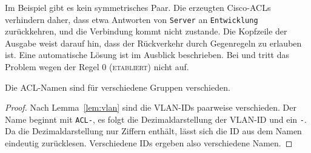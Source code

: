 \begin{bemerkung}
	Im Beispiel gibt es kein symmetrisches Paar. Die erzeugten Cisco-ACLs verhindern daher, dass etwa Antworten von \texttt{Server} an \texttt{Entwicklung} zurückkehren, und die Verbindung kommt nicht zustande. Die Kopfzeile der Ausgabe weist darauf hin, dass der Rückverkehr durch Gegenregeln zu erlauben ist. Eine automatische Lösung ist im Ausblick beschrieben. Bei  und  tritt das Problem wegen der Regel $0$ (\textsc{etabliert}) nicht auf.
\end{bemerkung}

\begin{lemma}
	Die ACL-Namen  sind für verschiedene Gruppen verschieden.
\end{lemma}

\begin{proof}
	Nach Lemma~\ref{lem:vlan} sind die VLAN-IDs paarweise verschieden. Der Name beginnt mit \texttt{ACL-}, es folgt die Dezimaldarstellung der VLAN-ID und ein \texttt{-}. Da die Dezimaldarstellung nur Ziffern enthält, lässt sich die ID aus dem Namen eindeutig zurücklesen. Verschiedene IDs ergeben also verschiedene Namen.
\end{proof}

